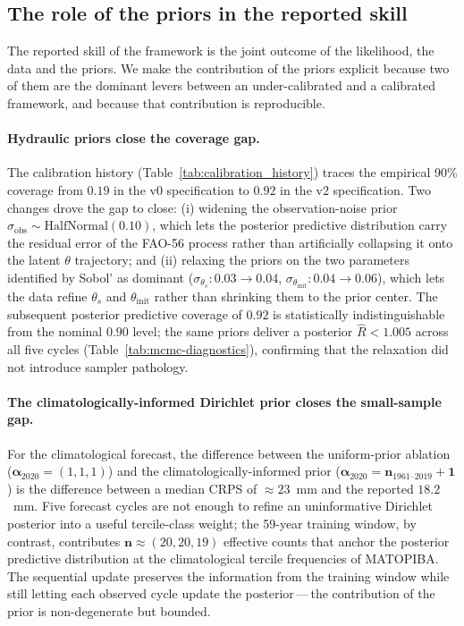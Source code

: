 \documentclass[review,5p,times]{elsarticle}
\begin{document}
\subsection{The role of the priors in the reported skill}
\label{sec:discussion_priors}

The reported skill of the framework is the joint outcome of the
likelihood, the data and the priors. We make the contribution of the
priors explicit because two of them are the dominant levers between
an under-calibrated and a calibrated framework, and because that
contribution is reproducible.

\paragraph{Hydraulic priors close the coverage gap.} The
calibration history (Table~\ref{tab:calibration_history}) traces the
empirical 90\% coverage from $0.19$ in the v0 specification to
$0.92$ in the v2 specification. Two changes drove the gap to close:
(i) widening the observation-noise prior
$\sigma_{\mathrm{obs}}\sim\mathrm{HalfNormal}(0.10)$, which lets the
posterior predictive distribution carry the residual error of the
FAO-56 process rather than artificially collapsing it onto the
latent $\theta$ trajectory; and (ii) relaxing the priors on the
two parameters identified by Sobol' as dominant
($\sigma_{\theta_s}: 0.03\to 0.04$,
$\sigma_{\theta_{\mathrm{init}}}: 0.04\to 0.06$), which lets the
data refine $\theta_s$ and $\theta_{\mathrm{init}}$ rather than
shrinking them to the prior center. The subsequent posterior
predictive coverage of $0.92$ is statistically indistinguishable
from the nominal $0.90$ level; the same priors deliver a posterior
$\hat{R}<1.005$ across all five cycles
(Table~\ref{tab:mcmc-diagnostics}), confirming that the relaxation
did not introduce sampler pathology.

\paragraph{The climatologically-informed Dirichlet prior closes the
small-sample gap.} For the climatological forecast, the difference
between the uniform-prior ablation
($\boldsymbol{\alpha}_{2020}=(1,1,1)$) and the
climatologically-informed prior
($\boldsymbol{\alpha}_{2020}=\boldsymbol{n}_{1961\text{--}2019}+\boldsymbol{1}$)
is the difference between a median CRPS of $\approx 23$~mm and the
reported $18.2$~mm. Five forecast cycles are not enough to refine an
uninformative Dirichlet posterior into a useful tercile-class
weight; the 59-year training window, by contrast, contributes
$\boldsymbol{n}\approx(20,20,19)$ effective counts that anchor the
posterior predictive distribution at the climatological tercile
frequencies of MATOPIBA. The sequential update preserves the
information from the training window while still letting each
observed cycle update the posterior\,---\,the contribution of the
prior is non-degenerate but bounded.
\end{document}
